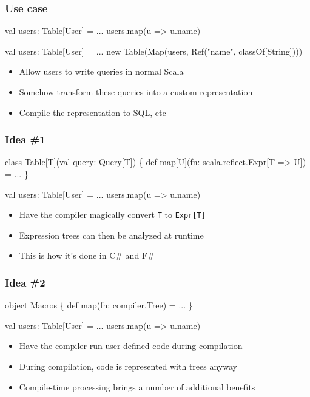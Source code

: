\documentclass[svgnames,dvipsnames,hyperref={bookmarks=false},usepdftitle=false]{beamer}
\begin{document}
\begin{frame}[fragile]
\frametitle{Use case}

\begin{semiverbatim}
val users: Table[User] = ...
users.map(\alert{u => u.name})

                          \arrowdown

val users: Table[User] = ...
new Table(Map(users, \alert{Ref("name", classOf[String])}))

\end{semiverbatim}

\begin{itemize}
\item Allow users to write queries in normal Scala
\item Somehow transform these queries into a custom representation
\item Compile the representation to SQL, etc
\end{itemize}
\end{frame}

\begin{frame}[fragile]
\frametitle{Idea \#1}

\begin{semiverbatim}
class Table[T](val query: Query[T]) \{
  def map[U](fn: \alert{scala.reflect.Expr[T => U]}) = ...
\}

val users: Table[User] = ...
users.map(\alert{u => u.name})

\end{semiverbatim}

\begin{itemize}
\item Have the compiler magically convert \texttt{T} to \texttt{Expr[T]}
\item Expression trees can then be analyzed at runtime
\item This is how it's done in C\# and F\#
\end{itemize}
\end{frame}

\begin{frame}[fragile]
\frametitle{Idea \#2}

\begin{semiverbatim}
object Macros \{
  def map(fn: \alert{compiler.Tree}) = ...
\}

val users: Table[User] = ...
users.map(\alert{u => u.name})

\end{semiverbatim}

\begin{itemize}
\item Have the compiler run user-defined code during compilation
\item During compilation, code is represented with trees anyway
\item Compile-time processing brings a number of additional benefits
\end{itemize}
\end{frame}
\end{document}
